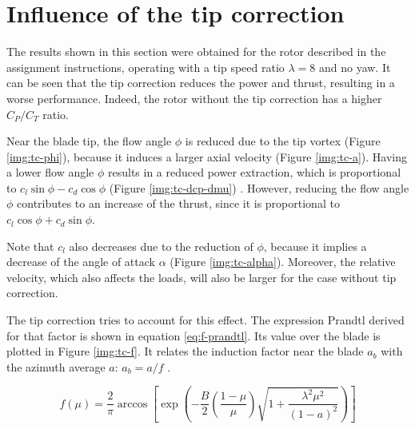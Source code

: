 \section{Influence of the tip correction }

The results shown in this section were obtained for the rotor described in the assignment instructions, operating with a tip speed ratio $ \lambda = 8 $ and no yaw. It can be seen that the tip correction reduces the power and thrust, resulting in a worse performance. Indeed, the rotor without the tip correction has a higher $ C_P/C_T $ ratio.

Near the blade tip, the flow angle $ \phi $ is reduced due to the tip vortex (Figure \ref{img:tc-phi}), because it induces a larger axial velocity (Figure \ref{img:tc-a}). Having a lower flow angle $ \phi $ results in a reduced power extraction, which is proportional to $ c_l \sin \phi - c_d \cos \phi $ (Figure \ref{img:tc-dcp-dmu}) \cite{weh-ch3}. However, reducing the flow angle $ \phi $ contributes to an increase of the thrust, since it is proportional to $ c_l \cos \phi + c_d \sin \phi $.

Note that $ c_l $ also decreases due to the reduction of $ \phi $, because it implies a decrease of the angle of attack $ \alpha $ (Figure \ref{img:tc-alpha}). Moreover, the relative velocity, which also affects the loads, will also be larger for the case without tip correction.

The tip correction tries to account for this effect. The expression Prandtl derived for that factor is shown in equation \ref{eq:f-prandtl}. Its value over the blade is plotted in Figure \ref{img:tc-f}. It relates the induction factor near the blade $ a_b $ with the azimuth average $ a $: $ a_b = a/f $ \cite{weh-ch3}.

\begin{equation}
f(\mu) = \frac{2}{\pi} \arccos \left[ \exp \left( - \frac{B}{2} \left( \frac{1-\mu}{\mu} \right) \sqrt{1+\frac{\lambda^2\mu^2}{(1-a)^2}} \right) \right]
\label{eq:f-prandtl}
\end{equation}

